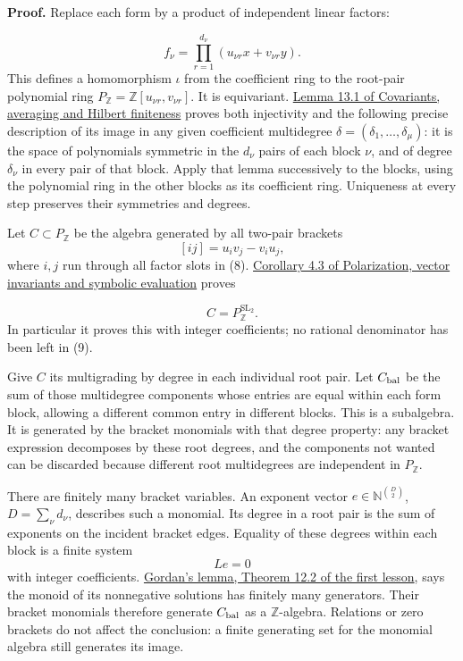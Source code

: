 \documentclass[
]{article}
\begin{document}
\textbf{Proof.} Replace each form by a product of independent linear
factors: \protect{}\label{equation-8}{}

\[
f_\nu=\prod_{r=1}^{d_\nu}(u_{\nu r}x+v_{\nu r}y).
\tag{8}
\] This defines a homomorphism \(\iota\) from the coefficient ring to
the root-pair polynomial ring
\(P_{\mathbb Z}=\mathbb Z [u_{\nu r},v_{\nu r}]\). It is equivariant.
\href{NOE-INV-01.html\#lemma-13-1}{Lemma 13.1 of Covariants, averaging
and Hilbert finiteness} proves both injectivity and the following
precise description of its image in any given coefficient multidegree
\(\delta=(\delta_1,\ldots,\delta_\mu)\): it is the space of polynomials
symmetric in the \(d_\nu\) pairs of each block \(\nu\), and of degree
\(\delta_\nu\) in every pair of that block. Apply that lemma
successively to the blocks, using the polynomial ring in the other
blocks as its coefficient ring. Uniqueness at every step preserves their
symmetries and degrees.

Let \(C\subset P_{\mathbb Z}\) be the algebra generated by all two-pair
brackets \[
[ij]=u_i v_j-v_i u_j,
\] where \(i,j\) run through all factor slots in (8).
\href{NOE-INV-02.html\#corollary-4-3}{Corollary 4.3 of Polarization,
vector invariants and symbolic evaluation} proves
\protect{}\label{equation-9}{}

\[
C=P_{\mathbb Z}^{\operatorname{SL}_2}.
\tag{9}
\] In particular it proves this with integer coefficients; no rational
denominator has been left in (9).

Give \(C\) its multigrading by degree in each individual root pair. Let
\(C_{\rm bal}\) be the sum of those multidegree components whose entries
are equal within each form block, allowing a different common entry in
different blocks. This is a subalgebra. It is generated by the bracket
monomials with that degree property: any bracket expression decomposes
by these root degrees, and the components not wanted can be discarded
because different root multidegrees are independent in
\(P_{\mathbb Z}\).

There are finitely many bracket variables. An exponent vector
\(e\in\mathbb N^{\binom D2}\), \(D=\sum_\nu d_\nu\), describes such a
monomial. Its degree in a root pair is the sum of exponents on the
incident bracket edges. Equality of these degrees within each block is a
finite system \[
Le=0
\] with integer coefficients.
\href{NOE-INV-01.html\#theorem-12-2}{Gordan's lemma, Theorem 12.2 of the
first lesson}, says the monoid of its nonnegative solutions has finitely
many generators. Their bracket monomials therefore generate
\(C_{\rm bal}\) as a \(\mathbb Z\)-algebra. Relations or zero brackets
do not affect the conclusion: a finite generating set for the monomial
algebra still generates its image.
\end{document}
